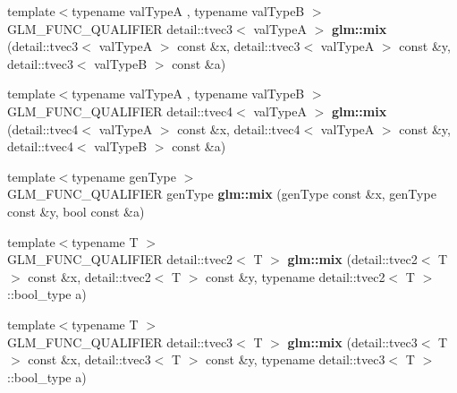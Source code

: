 \begin{DoxyCompactItemize}
\item 
\hypertarget{namespaceglm_a333a460f5247bcbfaaa3fdf290b566be}{{\footnotesize template$<$typename val\-Type\-A , typename val\-Type\-B $>$ }\\\-G\-L\-M\-\_\-\-F\-U\-N\-C\-\_\-\-Q\-U\-A\-L\-I\-F\-I\-E\-R \*
detail\-::tvec3$<$ val\-Type\-A $>$ {\bfseries glm\-::mix} (detail\-::tvec3$<$ val\-Type\-A $>$ const \&x, detail\-::tvec3$<$ val\-Type\-A $>$ const \&y, detail\-::tvec3$<$ val\-Type\-B $>$ const \&a)}\label{namespaceglm_a333a460f5247bcbfaaa3fdf290b566be}

\item 
\hypertarget{namespaceglm_a690d992e126245867b84a16c04d7d11a}{{\footnotesize template$<$typename val\-Type\-A , typename val\-Type\-B $>$ }\\\-G\-L\-M\-\_\-\-F\-U\-N\-C\-\_\-\-Q\-U\-A\-L\-I\-F\-I\-E\-R \*
detail\-::tvec4$<$ val\-Type\-A $>$ {\bfseries glm\-::mix} (detail\-::tvec4$<$ val\-Type\-A $>$ const \&x, detail\-::tvec4$<$ val\-Type\-A $>$ const \&y, detail\-::tvec4$<$ val\-Type\-B $>$ const \&a)}\label{namespaceglm_a690d992e126245867b84a16c04d7d11a}

\item 
\hypertarget{namespaceglm_a172536feafb5402782de75ba0b9105bc}{{\footnotesize template$<$typename gen\-Type $>$ }\\\-G\-L\-M\-\_\-\-F\-U\-N\-C\-\_\-\-Q\-U\-A\-L\-I\-F\-I\-E\-R gen\-Type {\bfseries glm\-::mix} (gen\-Type const \&x, gen\-Type const \&y, bool const \&a)}\label{namespaceglm_a172536feafb5402782de75ba0b9105bc}

\item 
\hypertarget{namespaceglm_a05ad08dcf9406a0f4fc653e91052cc7d}{{\footnotesize template$<$typename T $>$ }\\\-G\-L\-M\-\_\-\-F\-U\-N\-C\-\_\-\-Q\-U\-A\-L\-I\-F\-I\-E\-R \*
detail\-::tvec2$<$ \-T $>$ {\bfseries glm\-::mix} (detail\-::tvec2$<$ \-T $>$ const \&x, detail\-::tvec2$<$ \-T $>$ const \&y, typename detail\-::tvec2$<$ \-T $>$\-::bool\-\_\-type a)}\label{namespaceglm_a05ad08dcf9406a0f4fc653e91052cc7d}

\item 
\hypertarget{namespaceglm_ae3f77298c77a5050ee511baee6d33044}{{\footnotesize template$<$typename T $>$ }\\\-G\-L\-M\-\_\-\-F\-U\-N\-C\-\_\-\-Q\-U\-A\-L\-I\-F\-I\-E\-R \*
detail\-::tvec3$<$ \-T $>$ {\bfseries glm\-::mix} (detail\-::tvec3$<$ \-T $>$ const \&x, detail\-::tvec3$<$ \-T $>$ const \&y, typename detail\-::tvec3$<$ \-T $>$\-::bool\-\_\-type a)}\label{namespaceglm_ae3f77298c77a5050ee511baee6d33044}


\end{DoxyCompactItemize}
